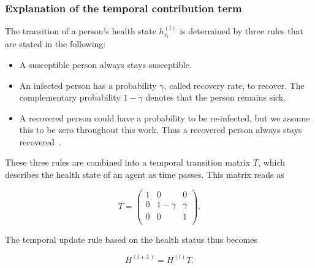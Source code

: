 \subsubsection{Explanation of the temporal contribution term}

The transition of a person's health state $h_{v_i}^{(l)}$ is determined by three rules that are stated in the following:

\begin{itemize}
	\item A susceptible person always stays susceptible.
	\item An infected person has a probability $\gamma$, called recovery rate, to recover. The complementary probability $1-\gamma$ denotes that the person remains sick.
	\item A recovered person could have a probability to be re-infected, but we assume this to be zero throughout this work. Thus a recovered person always stays recovered~\cite{Bao2020.03.13.990226}.
\end{itemize}

These three rules are combined into a temporal transition matrix $T$, which describes the health state of an agent as time passes. This matrix reads as

\begin{equation}
	T = 
	\begin{pmatrix}
		1 &     0    & 0      \\
		0 & 1-\gamma & \gamma \\
		0 &     0    & 1      \\
	\end{pmatrix}.
\end{equation}

The temporal update rule based on the health status thus becomes

\begin{equation}
	H^{(l+1)} = H^{(l)} T.
\end{equation}